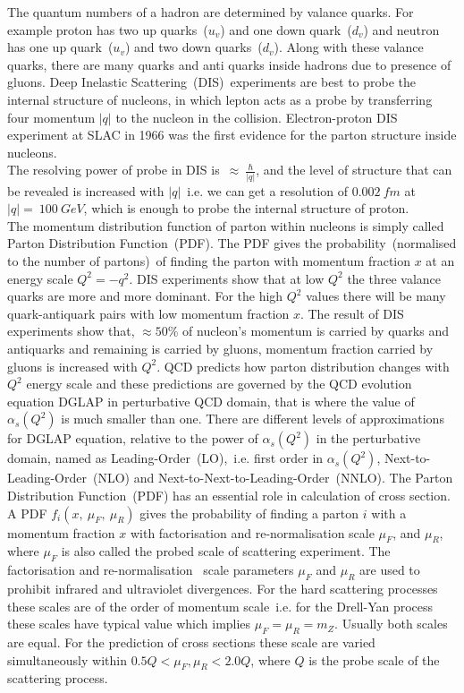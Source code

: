 The quantum numbers of a hadron are determined by valance quarks. For example proton has two up quarks~($u_{v}$) and one down quark~($d_{v}$) and neutron has one up quark~($u_{v}$) and two down quarks~($d_{v}$). Along with these valance quarks, there are many quarks and anti quarks inside hadrons due to presence of gluons.
Deep Inelastic Scattering~(DIS)~experiments are best to probe the internal structure of nucleons, in which lepton acts as a probe by transferring four momentum $|q|$ to the nucleon in the collision. Electron-proton DIS experiment at SLAC in 1966 was the first evidence for the parton structure inside nucleons.\\
The resolving power of probe in DIS is~$\approx~\frac{\hbar}{|q|}$, and the level of structure that can be revealed is increased with $|q|$~i.e. we can get a resolution of $0.002~fm$ at $|q|=~100~GeV$, which is enough to probe the internal structure of proton.\\
The momentum distribution function of parton within nucleons is simply called Parton Distribution Function~(PDF). The PDF gives the probability~(normalised to the number of partons)~of finding the parton with momentum fraction $x$ at an energy scale $Q^{2}=-q^{2}$. DIS experiments show that at low $Q^{2}$ the three valance quarks are more and more dominant. For the high $Q^{2}$ values there will be many quark-antiquark pairs with low momentum fraction $x$. The result of DIS experiments show that, $\approx50\%$ of nucleon's momentum is carried by quarks and antiquarks and remaining is carried by gluons, momentum fraction carried by gluons is increased with $Q^{2}$. 
QCD predicts how parton distribution changes with $Q^{2}$ energy scale and these predictions are governed by the QCD evolution equation DGLAP in perturbative QCD domain, that is where the value of $\alpha_{s}(Q^{2})$ is much smaller than one. There are different levels of approximations for DGLAP equation, relative to the power of $\alpha_{s}(Q^{2})$ in the perturbative domain, named as Leading-Order~(LO),~i.e. first order in $\alpha_{s}(Q^{2})$, Next-to-Leading-Order~(NLO) and Next-to-Next-to-Leading-Order~(NNLO). The Parton Distribution Function~(PDF) has an essential role in calculation of cross section. A PDF  $f_{i}(x,~\mu_{F},~\mu_{R})$ gives the probability of finding a parton $i$ with a momentum fraction $x$ with factorisation and re-normalisation scale $\mu_{F}$, and $\mu_{R}$, where $\mu_{F}$ is also called the probed scale of scattering experiment. The factorisation and re-normalisation~\cite{Mukhi:2019yrf} scale parameters $\mu_{F}$ and $\mu_{R}$ are used to prohibit infrared and ultraviolet divergences. For the hard scattering processes these scales are of the order of momentum scale~i.e. for the Drell-Yan process~\cite{Peng:2016ebs} these scales have typical value which implies $\mu_{F}=\mu_{R}=m_{Z}$. Usually both scales are equal. For the prediction of cross sections these scale are varied simultaneously within $0.5Q<\mu_{F},\mu_{R}<2.0Q$, where $Q$ is the probe scale of the scattering process.\\
